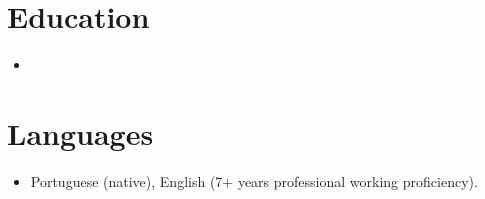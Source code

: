 \documentclass[11pt,a4paper,sans]{moderncv}
\begin{document}

\section{Education}
\vspace{1pt}
\begin{itemize}

\item{}

\end{itemize}


\section{Languages}
\vspace{1pt}
\begin{itemize}
\item Portuguese (native), English (7+ years professional working proficiency).
\end{itemize}
\end{document}
